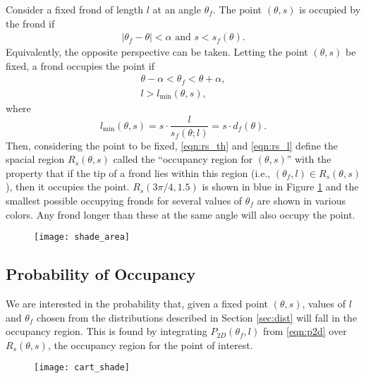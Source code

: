 Consider a fixed frond of length $l$ at an angle $\theta_f$. The point
$(\theta,s)$ is occupied by the frond if
\begin{align*}
	\left|\theta_f - \theta \right| < \alpha
  \mbox{ and }
	s < s_f(\theta).
\end{align*}
Equivalently, the opposite perspective can be taken.
Letting the point $(\theta,s)$ be fixed, a frond occupies the point if
\begin{align}
	\theta - \alpha < \theta_f < \theta + \alpha,
	\label{eqn:rs_th} \\
	l > l_{\min}(\theta,s),
	\label{eqn:rs_l}
\end{align}
where
\begin{equation}
	l_{\min}(\theta,s) = s \cdot \frac{l}{s_f(\theta;l)} = s \cdot d_f(\theta).
  \label{eqn:l_min}
\end{equation}
Then, considering the point to be fixed, \eqref{eqn:rs_th} and \eqref{eqn:rs_l} define the spacial region $R_s(\theta,s)$ called the ``occupancy region for $(\theta,s)$'' with the property that if the tip of a frond lies within this region (i.e., $(\theta_f,l) \in R_s(\theta,s)$), then it occupies the point.
$R_s(3\pi/4,1.5)$ is shown in blue in Figure \ref{fig:shade_area} and the smallest possible occupying fronds for several values of $\theta_f$ are shown in various colors.
Any frond longer than these at the same angle will also occupy the point.

\begin{figure}[h]
	\centering
	\texttt{[image: shade\_area]}
	\label{fig:shade_area}
\end{figure}

\subsection{Probability of Occupancy}
We are interested in the probability that, given a fixed point $(\theta,s)$, values of $l$ and $\theta_f$ chosen from the distributions described in Section \ref{sec:dist} will fall in the occupancy region.
This is found by integrating $P_{2D}(\theta_f, l)$ from \eqref{eqn:p2d} over $R_s(\theta,s)$, the occupancy region for the point of interest.

\begin{figure}[h]
	\centering
	\texttt{[image: cart\_shade]}
	\label{fig:cart_shade}
\end{figure}

